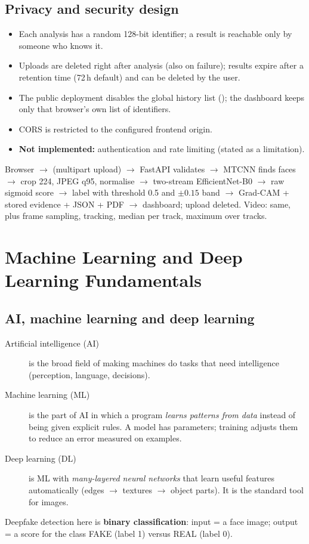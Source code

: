 \documentclass[11pt,a4paper]{report}
\newcommand{\code}[1]{\texttt{\detokenize{#1}}}
\begin{document}
\section{Privacy and security design}
\begin{itemize}
\item Each analysis has a random 128-bit identifier; a result is reachable only by someone who knows it.
\item Uploads are deleted right after analysis (also on failure); results expire after a retention time (72\,h default) and can be deleted by the user.
\item The public deployment disables the global history list (\code{VERIFAI_PUBLIC_HISTORY=false}); the dashboard keeps only that browser's own list of identifiers.
\item CORS is restricted to the configured frontend origin.
\item \textbf{Not implemented:} authentication and rate limiting (stated as a limitation).
\end{itemize}

\begin{sayit}
Browser $\rightarrow$ (multipart upload) $\rightarrow$ FastAPI validates $\rightarrow$ MTCNN finds faces $\rightarrow$ crop 224, JPEG q95, normalise $\rightarrow$ two-stream EfficientNet-B0 $\rightarrow$ raw sigmoid score $\rightarrow$ label with threshold 0.5 and $\pm0.15$ band
$\rightarrow$ Grad-CAM + stored evidence + JSON + PDF $\rightarrow$ dashboard; upload deleted. Video: same, plus frame sampling, tracking, median per track, maximum over tracks.
\end{sayit}

\chapter{Machine Learning and Deep Learning Fundamentals}

\section{AI, machine learning and deep learning}
\begin{description}
\item[Artificial intelligence (AI)] is the broad field of making machines do tasks that need intelligence (perception, language, decisions).
\item[Machine learning (ML)] is the part of AI in which a program \emph{learns patterns from data} instead of being given explicit rules. A model has parameters; training adjusts them to reduce an error measured on examples.
\item[Deep learning (DL)] is ML with \emph{many-layered neural networks} that learn useful features automatically (edges $\rightarrow$ textures $\rightarrow$ object parts). It is the standard tool for images.
\end{description}
Deepfake detection here is \textbf{binary classification}: input = a face image; output = a score for the class FAKE (label 1) versus REAL (label 0).
\end{document}
